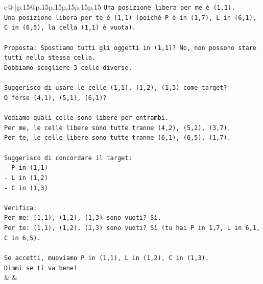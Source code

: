 \documentclass{article}
\begin{document}
{\begin{supertabular}{c@{$\;$}|p{.15\linewidth}@{}p{.15\linewidth}p{.15\linewidth}p{.15\linewidth}p{.15\linewidth}p{.15\linewidth}}
{{{\texttt{Una posizione libera per me è (1,1).} \\
\texttt{Una posizione libera per te è (1,1) (poiché P è in (1,7), L in (6,1), C in (6,5), la cella (1,1) è vuota).} \\
\\ 
\texttt{Proposta: Spostiamo tutti gli oggetti in (1,1)? No, non possono stare tutti nella stessa cella.} \\
\texttt{Dobbiamo scegliere 3 celle diverse.} \\
\\ 
\texttt{Suggerisco di usare le celle (1,1), (1,2), (1,3) come target?} \\
\texttt{O forse (4,1), (5,1), (6,1)?} \\
\\ 
\texttt{Vediamo quali celle sono libere per entrambi.} \\
\texttt{Per me, le celle libere sono tutte tranne (4,2), (5,2), (3,7).} \\
\texttt{Per te, le celle libere sono tutte tranne (6,1), (6,5), (1,7).} \\
\\ 
\texttt{Suggerisco di concordare il target:} \\
\texttt{{-} P in (1,1)} \\
\texttt{{-} L in (1,2)} \\
\texttt{{-} C in (1,3)} \\
\\ 
\texttt{Verifica:} \\
\texttt{Per me: (1,1), (1,2), (1,3) sono vuoti? Sì.} \\
\texttt{Per te: (1,1), (1,2), (1,3) sono vuoti? Sì (tu hai P in 1,7, L in 6,1, C in 6,5).} \\
\\ 
\texttt{Se accetti, muoviamo P in (1,1), L in (1,2), C in (1,3).} \\
\texttt{Dimmi se ti va bene!} \\
            }
        }
    }
    & & \\ \\


\end{supertabular}}
\end{document}
